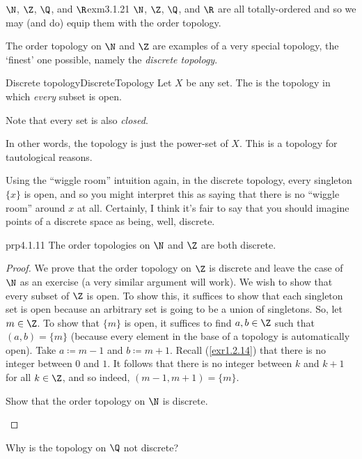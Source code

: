 \begin{exm}{$\N$, $\Z$, $\Q$, and $\R$}{exm3.1.21}
$\N$, $\Z$, $\Q$, and $\R$ are all totally-ordered and so we may (and do) equip them with the order topology.
\end{exm}
The order topology on $\N$ and $\Z$ are examples of a very special topology, the `finest' one possible, namely the \emph{discrete topology}.
\begin{dfn}{Discrete topology}{DiscreteTopology}
Let $X$ be any set.  The  is the topology in which \emph{every} subset is open.
\begin{rmk}
Note that every set is also \emph{closed}.
\end{rmk}
\begin{rmk}
In other words, the topology is just the power-set of $X$.  This is a topology for tautological reasons.
\end{rmk}
\begin{rmk}
Using the ``wiggle room'' intuition again, in the discrete topology, every singleton $\{ x\}$ is open, and so you might interpret this as saying that there is no ``wiggle room'' around $x$ at all.  Certainly, I think it's fair to say that you should imagine points of a discrete space as being, well, discrete.
\end{rmk}
\end{dfn}
\begin{prp}{}{prp4.1.11}
The order topologies on $\N$ and $\Z$ are both discrete.
\begin{proof}
We prove that the order topology on $\Z$ is discrete and leave the case of $\N$ as an exercise (a very similar argument will work).  We wish to show that every subset of $\Z$ is open.  To show this, it suffices to show that each singleton set is open because an arbitrary set is going to be a union of singletons.  So, let $m\in \Z$.  To show that $\{ m\}$ is open, it suffices to find $a,b\in \Z$ such that $(a,b)=\{ m\}$ (because every element in the base of a topology is automatically open).  Take $a\coloneqq m-1$ and $b\coloneqq m+1$.  Recall (\cref{exr1.2.14}) that there is no integer between $0$ and $1$.  It follows that there is no integer between $k$ and $k+1$ for all $k\in \Z$, and so indeed, $(m-1,m+1)=\{ m\}$.
\begin{exr}{}{}
Show that the order topology on $\N$ is discrete.
\end{exr}
\end{proof}
\end{prp}
\begin{exr}{}{}
Why is the topology on $\Q$ not discrete?
\end{exr}

